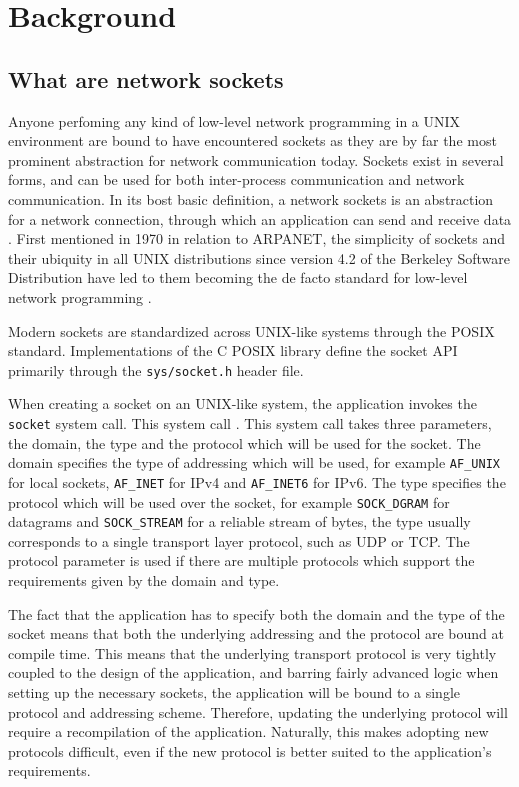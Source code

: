 \chapter{Background} \label{chap:background}
\section{What are network sockets}
Anyone perfoming any kind of low-level network programming in a UNIX
environment are bound to have encountered sockets as they are by
far the most prominent abstraction for network communication today.
Sockets exist
in several forms, and can be used for both inter-process communication
and network communication. 
In its bost basic definition, a network sockets is an abstraction
for a network connection, through which an application can send
and receive data \cite[p. 8]{donahooTCPIPSockets2009}. 
First mentioned in 1970 in relation to ARPANET, the
simplicity of sockets and their ubiquity in all UNIX distributions
since version 4.2 of the Berkeley Software Distribution have
led to them becoming the de facto standard for low-level network
programming \cite{crockerNewHostHostProtocol1970}\cite[p. 502]{tanenbaumComputerNetworks2011}.

Modern sockets are standardized across UNIX-like systems through
the POSIX standard. Implementations of the C POSIX library define
the socket API primarily through the \texttt{sys/socket.h} header file.

When creating a socket on an UNIX-like system, the application
invokes the \texttt{socket} system call. This system call
 \cite{Socket2LinuxManual}.
This system call takes three parameters, the domain, the type
and the protocol which will be used for the socket.
The domain specifies the type of
addressing which will be used, for example \texttt{AF\_UNIX}
for local sockets, \texttt{AF\_INET} for IPv4 and \texttt{AF\_INET6}
for IPv6. The type specifies the protocol which will be used over the socket, for
example \texttt{SOCK\_DGRAM} for datagrams and \texttt{SOCK\_STREAM}
for a reliable stream of bytes, the type usually corresponds to a
single transport layer protocol, such as UDP or TCP.
The protocol parameter is used if there are multiple protocols
which support the requirements given by the domain and type.

The fact that the application has to specify both the domain
and the type of the socket means that both the
underlying addressing and the protocol are bound at compile time.
This means that the underlying transport protocol is very tightly
coupled to the design of the application, and barring fairly
advanced logic when setting up
the necessary sockets, the application will be bound to a single 
protocol and addressing scheme. Therefore, updating
the underlying protocol will require a recompilation of the application. 
Naturally, this makes adopting new protocols difficult, even
if the new protocol is better suited to the application's requirements.

